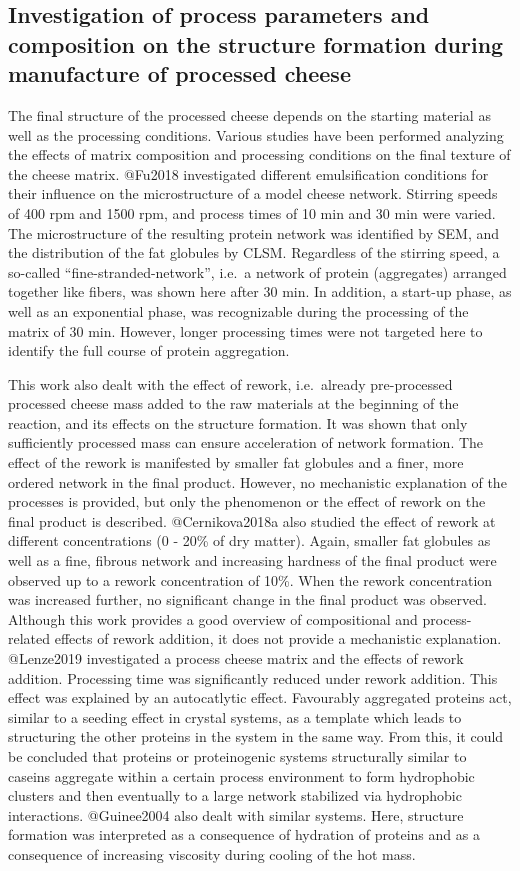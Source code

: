 \documentclass[
]{article}
\begin{document}
\subsection{Investigation of process parameters and composition on the structure formation during manufacture of processed cheese}

The final structure of the processed cheese depends on the starting
material as well as the processing conditions. Various studies have been
performed analyzing the effects of matrix composition and processing
conditions on the final texture of the cheese matrix. @Fu2018
investigated different emulsification conditions for their influence on
the microstructure of a model cheese network. Stirring speeds of 400 rpm
and 1500 rpm, and process times of 10 min and 30 min were varied. The
microstructure of the resulting protein network was identified by SEM,
and the distribution of the fat globules by CLSM. Regardless of the
stirring speed, a so-called ``fine-stranded-network'', i.e.~a network of
protein (aggregates) arranged together like fibers, was shown here after
30 min. In addition, a start-up phase, as well as an exponential phase,
was recognizable during the processing of the matrix of 30 min. However,
longer processing times were not targeted here to identify the full
course of protein aggregation.

This work also dealt with the effect of rework, i.e.~already
pre-processed processed cheese mass added to the raw materials at the
beginning of the reaction, and its effects on the structure formation.
It was shown that only sufficiently processed mass can ensure
acceleration of network formation. The effect of the rework is
manifested by smaller fat globules and a finer, more ordered network in
the final product. However, no mechanistic explanation of the processes
is provided, but only the phenomenon or the effect of rework on the
final product is described. @Cernikova2018a also studied the effect of
rework at different concentrations (0 - 20\% of dry matter). Again,
smaller fat globules as well as a fine, fibrous network and increasing
hardness of the final product were observed up to a rework concentration
of 10\%. When the rework concentration was increased further, no
significant change in the final product was observed. Although this work
provides a good overview of compositional and process-related effects of
rework addition, it does not provide a mechanistic explanation.
@Lenze2019 investigated a process cheese matrix and the effects of
rework addition. Processing time was significantly reduced under rework
addition. This effect was explained by an autocatlytic effect.
Favourably aggregated proteins act, similar to a seeding effect in
crystal systems, as a template which leads to structuring the other
proteins in the system in the same way. From this, it could be concluded
that proteins or proteinogenic systems structurally similar to caseins
aggregate within a certain process environment to form hydrophobic
clusters and then eventually to a large network stabilized via
hydrophobic interactions. @Guinee2004 also dealt with similar systems.
Here, structure formation was interpreted as a consequence of hydration
of proteins and as a consequence of increasing viscosity during cooling
of the hot mass.
\end{document}
